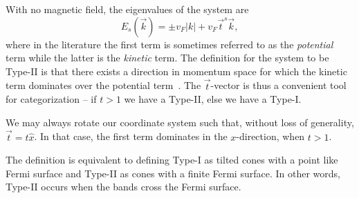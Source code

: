 With no magnetic field, the eigenvalues of the system are
\begin{equation}
  \label{eq:12}
  E_s(\vec{k})
  = \pm v_F |k| + v_F \vec{t}^s \vec{k},
\end{equation}
where in the literature the first term is sometimes referred to as the \emph{potential} term while the latter is the \emph{kinetic} term.
The definition for the system to be Type-II is that there exists a direction in momentum space for which the kinetic term dominates over the potential term~\cite{soluyanovTypeIIWeylSemimetals2015}.
The \(\vec{t}\)-vector is thus a convenient tool for categorization -- if \(t > 1\) we have a Type-II, else we have a Type-I.
\begin{Proof}
  We may always rotate our coordinate system such that, without loss of generality, \(\vec{t} = t \hat{x}\).
  In that case, the first term dominates in the \(x\)-direction, when $t>1$.
\end{Proof}
The definition is equivalent to defining Type-I as tilted cones with a point like Fermi surface and Type-II as cones with a finite Fermi surface.
In other words, Type-II occurs when the bands cross the Fermi surface.



